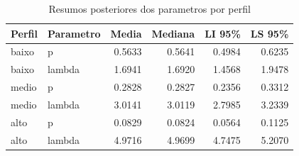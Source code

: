 \begin{table}

\caption{Resumos posteriores dos parametros por perfil}
\centering
\begin{tabular}[t]{llrrrr}
\toprule
Perfil & Parametro & Media & Mediana & LI 95\% & LS 95\%\\
\midrule
baixo & p & 0.5633 & 0.5641 & 0.4984 & 0.6235\\
baixo & lambda & 1.6941 & 1.6920 & 1.4568 & 1.9478\\
medio & p & 0.2828 & 0.2827 & 0.2356 & 0.3312\\
medio & lambda & 3.0141 & 3.0119 & 2.7985 & 3.2339\\
alto & p & 0.0829 & 0.0824 & 0.0564 & 0.1125\\
\addlinespace
alto & lambda & 4.9716 & 4.9699 & 4.7475 & 5.2070\\
\bottomrule
\end{tabular}
\end{table}
